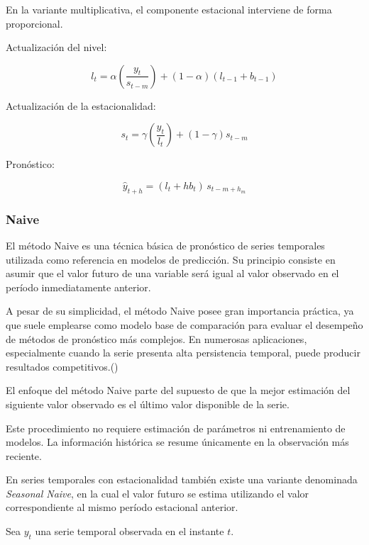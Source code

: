 En la variante multiplicativa, el componente estacional interviene de forma proporcional.

Actualización del nivel:

\begin{equation}
	l_t = \alpha \left(\frac{y_t}{s_{t-m}}\right) + (1-\alpha)(l_{t-1}+b_{t-1})
\end{equation}

Actualización de la estacionalidad:

\begin{equation}
	s_t = \gamma \left(\frac{y_t}{l_t}\right) + (1-\gamma)s_{t-m}
\end{equation}

Pronóstico:

\begin{equation}
	\hat{y}_{t+h} = (l_t + hb_t)\, s_{t-m+h_m}
\end{equation}



\subsubsection{Naive}

El método Naive es una técnica básica de pronóstico de series temporales utilizada como referencia en modelos de predicción. Su principio consiste en asumir que el valor futuro de una variable será igual al valor observado en el período inmediatamente anterior.

A pesar de su simplicidad, el método Naive posee gran importancia práctica, ya que suele emplearse como modelo base de comparación para evaluar el desempeño de métodos de pronóstico más complejos. En numerosas aplicaciones, especialmente cuando la serie presenta alta persistencia temporal, puede producir resultados competitivos.(\cite{hyndman2018forecastingNV})


El enfoque del método Naive parte del supuesto de que la mejor estimación del siguiente valor observado es el último valor disponible de la serie.

Este procedimiento no requiere estimación de parámetros ni entrenamiento de modelos. La información histórica se resume únicamente en la observación más reciente.

En series temporales con estacionalidad también existe una variante denominada \textit{Seasonal Naive}, en la cual el valor futuro se estima utilizando el valor correspondiente al mismo período estacional anterior.


Sea \(y_t\) una serie temporal observada en el instante \(t\).

